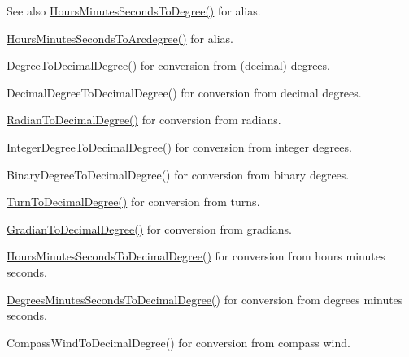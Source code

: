\begin{DoxySeeAlso}{See also}
\mbox{\hyperlink{group___e_g_x_math-_angle_conversions-_hours_minutes_seconds_ga4f66698550a0cf0fd326f25aba2c0d80}{Hours\+Minutes\+Seconds\+To\+Degree()}} for alias. 

\mbox{\hyperlink{group___e_g_x_math-_angle_conversions-_hours_minutes_seconds_ga3c38143df47da88534ddbd13726748e2}{Hours\+Minutes\+Seconds\+To\+Arcdegree()}} for alias. 

\mbox{\hyperlink{group___e_g_x_math-_angle_conversions-_degree_ga568afc1d436d425bf5d4edea584aee08}{Degree\+To\+Decimal\+Degree()}} for conversion from (decimal) degrees. 

Decimal\+Degree\+To\+Decimal\+Degree() for conversion from decimal degrees. 

\mbox{\hyperlink{group___e_g_x_math-_angle_conversions-_radian_ga6d170f1882c32de53167c04524d05f67}{Radian\+To\+Decimal\+Degree()}} for conversion from radians. 

\mbox{\hyperlink{group___e_g_x_math-_angle_conversions-_integer_degree_gac219c3198508ba984d8d81d22831b27d}{Integer\+Degree\+To\+Decimal\+Degree()}} for conversion from integer degrees. 

Binary\+Degree\+To\+Decimal\+Degree() for conversion from binary degrees. 

\mbox{\hyperlink{group___e_g_x_math-_angle_conversions-_turn_ga79231536255e77fb7a158b99a30c1767}{Turn\+To\+Decimal\+Degree()}} for conversion from turns. 

\mbox{\hyperlink{group___e_g_x_math-_angle_conversions-_gradian_ga346f47c519d5261b689cec49f4a8e789}{Gradian\+To\+Decimal\+Degree()}} for conversion from gradians. 

\mbox{\hyperlink{group___e_g_x_math-_angle_conversions-_hours_minutes_seconds_gad6662d1113ae8aea6baca6317888b4cd}{Hours\+Minutes\+Seconds\+To\+Decimal\+Degree()}} for conversion from hours minutes seconds. 

\mbox{\hyperlink{group___e_g_x_math-_angle_conversions-_degrees_minutes_seconds_gab4d4c25623f86611692c39eb29f16141}{Degrees\+Minutes\+Seconds\+To\+Decimal\+Degree()}} for conversion from degrees minutes seconds. 

Compass\+Wind\+To\+Decimal\+Degree() for conversion from compass wind. 
\end{DoxySeeAlso}
\mbox{\label{group___e_g_x_math-_angle_conversions-_hours_minutes_seconds_ga4f66698550a0cf0fd326f25aba2c0d80}} 

